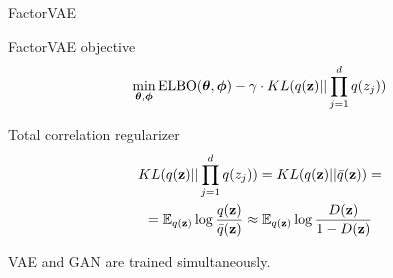 \begin{frame}{FactorVAE}
	
	\begin{block}{FactorVAE objective}
		\vspace{-0.3cm}
		\[
		\min_{\boldsymbol{\theta}, \boldsymbol{\phi}} \text{ELBO}(\boldsymbol{\theta}, \boldsymbol{\phi}) - \gamma \cdot KL(q(\mathbf{z}) || \prod_{j=1}^d q(z_j))
		\]
		\vspace{-0.3cm}
	\end{block}
	
	\begin{block}{Total correlation regularizer}
		\vspace{-0.7cm}
		\begin{multline*}
		KL(q(\mathbf{z}) || \prod_{j=1}^d q(z_j)) = KL(q(\mathbf{z}) || \bar{q}(\mathbf{z})) = \\ =\mathbb{E}_{q(\mathbf{z})} \log \frac{q(\mathbf{z})}{\bar{q}(\mathbf{z})} \approx \mathbb{E}_{q(\mathbf{z})} \log \frac{D(\mathbf{z})}{1 - D(\mathbf{z})}
		\end{multline*}
		\vspace{-0.3cm}
	\end{block}
	VAE and GAN are trained simultaneously.

\end{frame}
